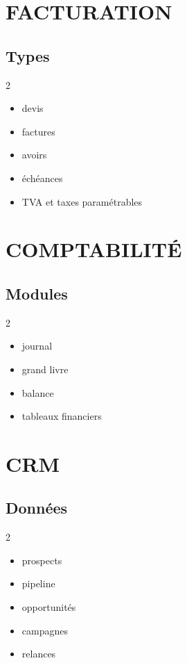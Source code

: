 \documentclass[12pt,a4paper,oneside]{book}
\begin{document}
\chapter{FACTURATION}

\section{Types}
\begin{multicols}{2}
\begin{itemize}
\item devis
\item factures
\item avoirs
\item échéances
\item TVA et taxes paramétrables
\end{itemize}
\end{multicols}

\chapter{COMPTABILITÉ}

\section{Modules}
\begin{multicols}{2}
\begin{itemize}
\item journal
\item grand livre
\item balance
\item tableaux financiers
\end{itemize}
\end{multicols}

\chapter{CRM}

\section{Données}
\begin{multicols}{2}
\begin{itemize}
\item prospects
\item pipeline
\item opportunités
\item campagnes
\item relances
\end{itemize}
\end{multicols}
\end{document}
